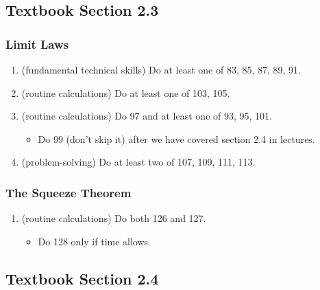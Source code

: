 \documentclass[../main.tex]{subfiles}
\begin{document}
\subsection*{Textbook Section 2.3}

\subsubsection*{Limit Laws}
\begin{enumerate}
  \item (fundamental technical skills) Do at least one of 83, 85, 87, 89, 91.
  \item (routine calculations) Do at least one of 103, 105.
  \item (routine calculations) Do 97 and at least one of 93, 95, 101.
    \begin{itemize}
      \item Do 99 (don't skip it) after we have covered section 2.4 in lectures.
    \end{itemize}
  \item (problem-solving) Do at least two of 107, 109, 111, 113.
\end{enumerate}

\subsubsection{The Squeeze Theorem}
\begin{enumerate}
  \item (routine calculations) Do both 126 and 127.
    \begin{itemize}
      \item Do 128 only if time allows.
    \end{itemize}
\end{enumerate}

\subsection*{Textbook Section 2.4}
\end{document}
